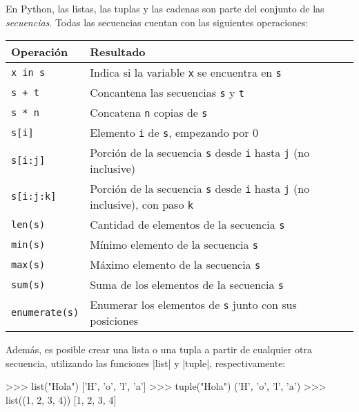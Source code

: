 \begin{sabias_que}
En Python, las listas, las tuplas y las cadenas son parte del conjunto
de las {\it secuencias}.  Todas las secuencias cuentan con las siguientes
operaciones:

\vspace{\medskipamount}
\begin{tabular}{l l}
{\bf Operación} & {\bf Resultado} \\
\hline
\lstinline!x in s! & Indica si la variable \lstinline!x! se encuentra en
    \lstinline!s! \\
\lstinline!s + t! & Concantena las secuencias \lstinline!s! y \lstinline!t! \\
\lstinline!s * n! & Concatena \lstinline!n! copias de \lstinline!s! \\
\lstinline!s[i]! & Elemento \lstinline!i! de \lstinline!s!, empezando por 0 \\
\lstinline!s[i:j]! & Porción de la secuencia \lstinline!s! desde
	\lstinline!i! hasta \lstinline!j! (no inclusive) \\
\lstinline!s[i:j:k]! & Porción de la secuencia \lstinline!s! desde
	\lstinline!i! hasta \lstinline!j! (no inclusive), con paso \lstinline!k!  \\
\lstinline!len(s)! & Cantidad de elementos de la secuencia \lstinline!s!  \\
\lstinline!min(s)! & Mínimo elemento de la secuencia \lstinline!s! \\
\lstinline!max(s)! & Máximo elemento de la secuencia \lstinline!s! \\
\lstinline!sum(s)! & Suma de los elementos de la secuencia \lstinline!s! \\
\lstinline!enumerate(s)! & Enumerar los elementos de \lstinline!s! junto con sus posiciones \\
\end{tabular}
\vspace{\medskipamount}

Además, es posible crear una lista o una tupla a partir de cualquier otra
secuencia, utilizando las funciones |list| y |tuple|, respectivamente:

\begin{codigo-python-sn}
>>> list("Hola")
['H', 'o', 'l', 'a']
>>> tuple("Hola")
('H', 'o', 'l', 'a')
>>> list((1, 2, 3, 4))
[1, 2, 3, 4]
\end{codigo-python-sn}
\end{sabias_que}


